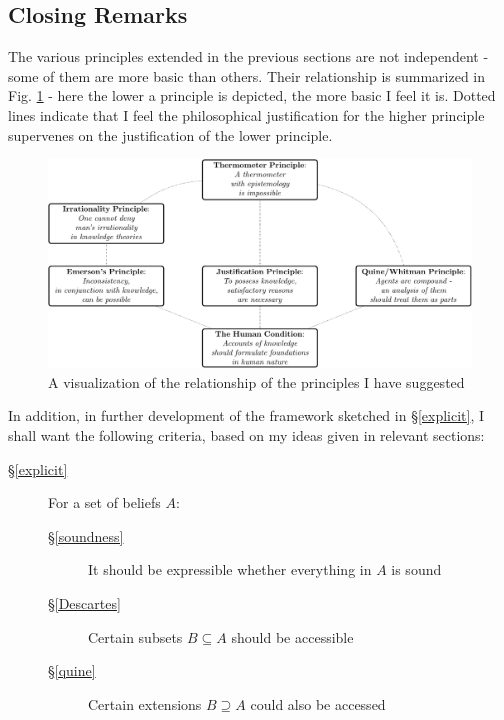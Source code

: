 \documentclass[11pt]{article}
\numberwithin{equation}{subsection}
\begin{document}
\subsection{Closing Remarks}
\label{close}
The various principles extended in the previous sections are not independent - some of them are more basic than others.  Their relationship is summarized in Fig. \ref{fig:principles} - here the lower a principle is depicted, the more basic I feel it is.  Dotted lines indicate that I feel the philosophical justification for the higher principle supervenes on the justification of the lower principle.
\begin{figure}[ht]
\begin{center}
\includegraphics[width=\textwidth]{principles/principles.pdf} 
\end{center}
\caption{A visualization of the relationship of the principles I have suggested}
\label{fig:principles}
\end{figure}
In addition, in further development of the framework sketched in \S\ref{explicit}, I shall want the following criteria, based on my ideas given in relevant sections:
\begin{description}
 \item[\S\ref{explicit}] 
  \item[] For a set of beliefs $A$:
\begin{description}
  \item[\S\ref{soundness}] It should be expressible whether everything in $A$ is sound 
  \item[\S\ref{Descartes}] Certain subsets $B\subseteq A$ should be accessible
  \item[\S\ref{quine}] Certain extensions $B \supseteq A$ could also be accessed
\end{description}
\end{description}
\end{document}
